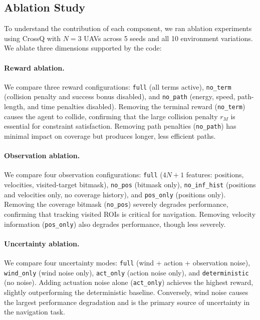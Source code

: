 \documentclass[letterpaper, 10 pt, conference]{ieeeconf}  %
\begin{document}
\subsection{Ablation Study}
\label{sec:ablation}
To understand the contribution of each component, we ran ablation experiments using CrossQ with $N=3$ UAVs across 5 seeds and all 10 environment variations. We ablate three dimensions supported by the code:

\paragraph{Reward ablation.} We compare three reward configurations: \texttt{full} (all terms active), \texttt{no\_term} (collision penalty and success bonus disabled), and \texttt{no\_path} (energy, speed, path-length, and time penalties disabled). Removing the terminal reward (\texttt{no\_term}) causes the agent to collide, confirming that the large collision penalty $r_M$ is essential for constraint satisfaction. Removing path penalties (\texttt{no\_path}) has minimal impact on coverage but produces longer, less efficient paths.

\paragraph{Observation ablation.} We compare four observation configurations: \texttt{full} ($4N+1$ features: positions, velocities, visited-target bitmask), \texttt{no\_pos} (bitmask only), \texttt{no\_inf\_hist} (positions and velocities only, no coverage history), and \texttt{pos\_only} (positions only). Removing the coverage bitmask (\texttt{no\_pos}) severely degrades performance, confirming that tracking visited ROIs is critical for navigation. Removing velocity information (\texttt{pos\_only}) also degrades performance, though less severely.

\paragraph{Uncertainty ablation.} We compare four uncertainty modes: \texttt{full} (wind + action + observation noise), \texttt{wind\_only} (wind noise only), \texttt{act\_only} (action noise only), and \texttt{deterministic} (no noise). Adding actuation noise alone (\texttt{act\_only}) achieves the highest reward, slightly outperforming the deterministic baseline. Conversely, wind noise causes the largest performance degradation and is the primary source of uncertainty in the navigation task.
\end{document}
